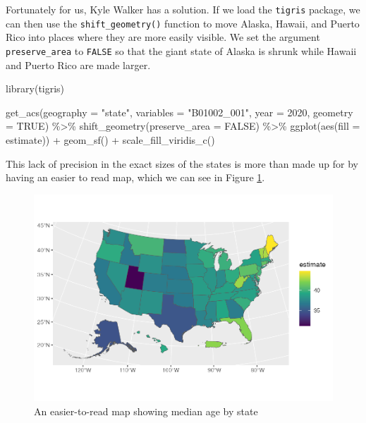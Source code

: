 \documentclass[
]{book}
\newenvironment{Shaded}{\begin{snugshade}}{\end{snugshade}}
\newcommand{\AttributeTok}[1]{\textcolor[rgb]{0.77,0.63,0.00}{#1}}
\newcommand{\ConstantTok}[1]{\textcolor[rgb]{0.00,0.00,0.00}{#1}}
\newcommand{\DecValTok}[1]{\textcolor[rgb]{0.00,0.00,0.81}{#1}}
\newcommand{\FunctionTok}[1]{\textcolor[rgb]{0.00,0.00,0.00}{#1}}
\newcommand{\NormalTok}[1]{#1}
\newcommand{\SpecialCharTok}[1]{\textcolor[rgb]{0.00,0.00,0.00}{#1}}
\newcommand{\StringTok}[1]{\textcolor[rgb]{0.31,0.60,0.02}{#1}}
\begin{document}
Fortunately for us, Kyle Walker has a solution. If we load the \texttt{tigris} package, we can then use the \texttt{shift\_geometry()} function to move Alaska, Hawaii, and Puerto Rico into places where they are more easily visible. We set the argument \texttt{preserve\_area} to \texttt{FALSE} so that the giant state of Alaska is shrunk while Hawaii and Puerto Rico are made larger.

\begin{Shaded}
\begin{Highlighting}[]
\FunctionTok{library}\NormalTok{(tigris)}

\FunctionTok{get\_acs}\NormalTok{(}\AttributeTok{geography =} \StringTok{"state"}\NormalTok{,}
        \AttributeTok{variables =} \StringTok{"B01002\_001"}\NormalTok{,}
        \AttributeTok{year =} \DecValTok{2020}\NormalTok{,}
        \AttributeTok{geometry =} \ConstantTok{TRUE}\NormalTok{) }\SpecialCharTok{\%\textgreater{}\%} 
  \FunctionTok{shift\_geometry}\NormalTok{(}\AttributeTok{preserve\_area =} \ConstantTok{FALSE}\NormalTok{) }\SpecialCharTok{\%\textgreater{}\%} 
  \FunctionTok{ggplot}\NormalTok{(}\FunctionTok{aes}\NormalTok{(}\AttributeTok{fill =}\NormalTok{ estimate)) }\SpecialCharTok{+}
  \FunctionTok{geom\_sf}\NormalTok{() }\SpecialCharTok{+}
  \FunctionTok{scale\_fill\_viridis\_c}\NormalTok{()}
\end{Highlighting}
\end{Shaded}

This lack of precision in the exact sizes of the states is more than made up for by having an easier to read map, which we can see in Figure \ref{fig:median-age-map-good}.

\begin{figure}
\includegraphics[width=1\linewidth]{tidycensus_files/figure-latex/median-age-map-good-1} \caption{An easier-to-read map showing median age by state}\label{fig:median-age-map-good}
\end{figure}
\end{document}
